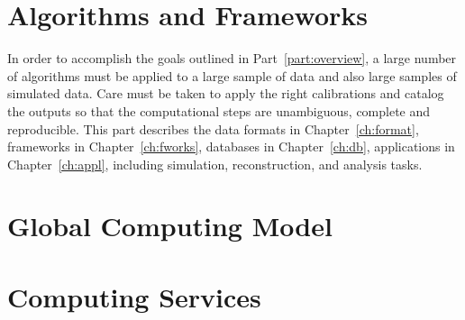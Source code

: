 \documentclass{dune} %
\begin{document}

\cleardoublepage


\cleardoublepage


\part{Algorithms and Frameworks} %

In order to accomplish the goals outlined in Part~\ref{part:overview}, a large number of algorithms must be applied to a large sample of data and also large samples of simulated data.  Care must be taken to apply the right calibrations and catalog the outputs so that the computational steps are unambiguous, complete and reproducible.  This part describes the data formats in Chapter~\ref{ch:format},  frameworks in Chapter~\ref{ch:fworks}, databases in Chapter~\ref{ch:db}, applications in Chapter~\ref{ch:appl}, including simulation, reconstruction, and analysis tasks.

\cleardoublepage
\cleardoublepage

\cleardoublepage


\cleardoublepage

\part{Global Computing Model  } %


\cleardoublepage


\cleardoublepage


\cleardoublepage


\cleardoublepage


\cleardoublepage

\part{Computing Services } %


\cleardoublepage
\end{document}
